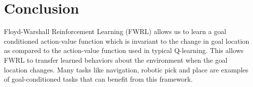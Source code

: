 \section{Conclusion}
Floyd-Warshall Reinforcement Learning (FWRL) allows us to learn a goal
conditioned action-value function which is invariant to the change in goal
location as compared to the action-value function used in typical Q-learning.
This allows FWRL to transfer learned behaviors about the environment when the
goal location changes. Many tasks like navigation, robotic pick and place are
examples of goal-conditioned tasks that can benefit from this framework.
